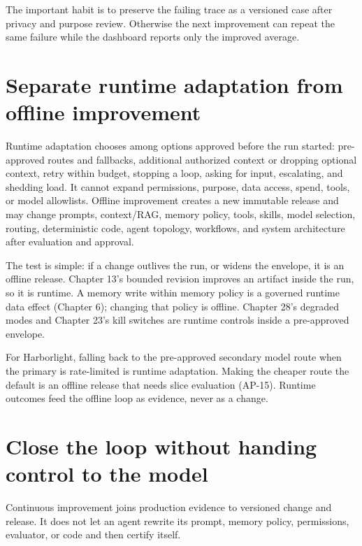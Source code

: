 The important habit is to preserve the failing trace as a versioned case after privacy and purpose review. Otherwise the next improvement can repeat the same failure while the dashboard reports only the improved average.\par

\section{Separate runtime adaptation from offline improvement}

Runtime adaptation chooses among options approved before the run started: pre-approved routes and fallbacks, additional authorized context or dropping optional context, retry within budget, stopping a loop, asking for input, escalating, and shedding load. It cannot expand permissions, purpose, data access, spend, tools, or model allowlists. Offline improvement creates a new immutable release and may change prompts, context/RAG, memory policy, tools, skills, model selection, routing, deterministic code, agent topology, workflows, and system architecture after evaluation and approval.\par

The test is simple: if a change outlives the run, or widens the envelope, it is an offline release. Chapter 13's bounded revision improves an artifact inside the run, so it is runtime. A memory write within memory policy is a governed runtime data effect (Chapter 6); changing that policy is offline. Chapter 28's degraded modes and Chapter 23's kill switches are runtime controls inside a pre-approved envelope.\par

For Harborlight, falling back to the pre-approved secondary model route when the primary is rate-limited is runtime adaptation. Making the cheaper route the default is an offline release that needs slice evaluation (AP-15). Runtime outcomes feed the offline loop as evidence, never as a change.\par


\section{Close the loop without handing control to the model}

Continuous improvement joins production evidence to versioned change and release. It does not let an agent rewrite its prompt, memory policy, permissions, evaluator, or code and then certify itself.\par

